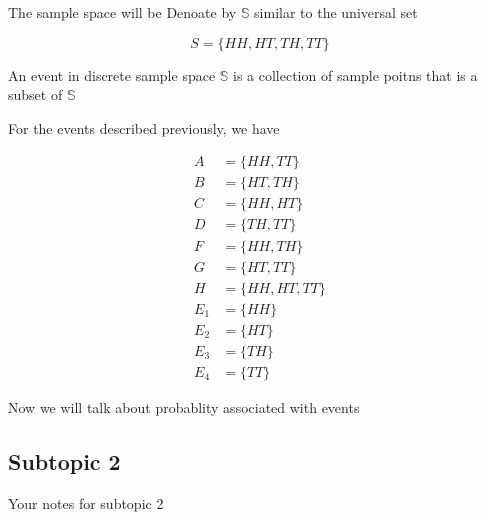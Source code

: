 \documentclass[12pt,a4paper]{article}
\begin{document}
The sample space will be Denoate by \( \mathbb{S} \) similar to the universal set 

\begin{equation}
  S = \{HH, HT, TH, TT\} 
\end{equation}

An event in discrete sample space \( \mathbb{S} \) is a collection of sample poitns that is a subset of \( \mathbb{S} \)

For the events described previously, we have 

\begin{equation}
\begin{aligned}
A &= \{HH, TT\} \\
B &= \{HT, TH\} \\
C &= \{HH, HT\} \\
D &= \{TH, TT\} \\
F &= \{HH, TH\} \\
G &= \{HT, TT\} \\
H &= \{HH, HT, TT\} \\
E_{1} &= \{HH\} \\
E_{2} &= \{HT\} \\
E_{3} &= \{TH\} \\
E_{4} &= \{TT\}
\end{aligned}
\end{equation}

Now we will talk about probablity associated with events 

\subsection{Subtopic 2}
Your notes for subtopic 2
\end{document}
